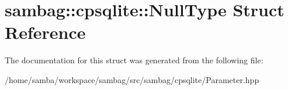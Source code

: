 \hypertarget{structsambag_1_1cpsqlite_1_1_null_type}{
\section{sambag::cpsqlite::NullType Struct Reference}
\label{structsambag_1_1cpsqlite_1_1_null_type}
}


The documentation for this struct was generated from the following file:\begin{DoxyCompactItemize}
\item 
/home/samba/workspace/sambag/src/sambag/cpsqlite/Parameter.hpp\end{DoxyCompactItemize}
